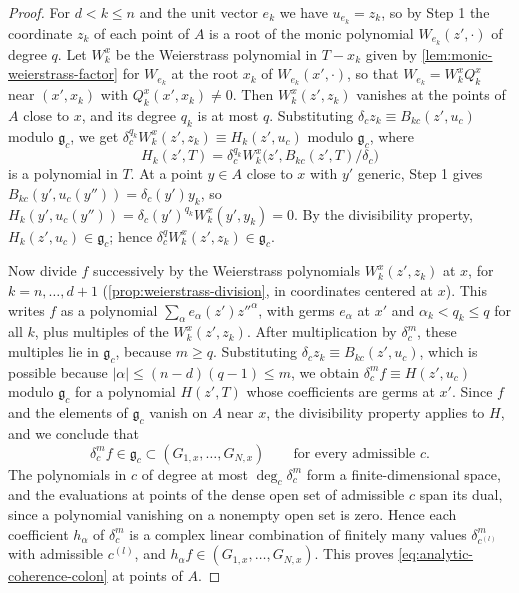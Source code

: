 \begin{proof}
For $d<k\leq n$ and the unit vector $e_k$ we have $u_{e_k}=z_k$, so by Step 1 the coordinate $z_k$ of each point of $A$ is a root of the monic polynomial $W_{e_k}(z',\cdot)$ of degree $q$. Let $W^x_k$ be the Weierstrass polynomial in $T-x_k$ given by \cref{lem:monic-weierstrass-factor} for $W_{e_k}$ at the root $x_k$ of $W_{e_k}(x',\cdot)$, so that $W_{e_k}=W^x_kQ^x_k$ near $(x',x_k)$ with $Q^x_k(x',x_k)\neq0$. Then $W^x_k(z',z_k)$ vanishes at the points of $A$ close to $x$, and its degree $q_k$ is at most $q$. Substituting $\delta_cz_k\equiv B_{kc}(z',u_c)$ modulo $\mathfrak g_c$, we get $\delta_c^{q_k}W^x_k(z',z_k)\equiv H_k(z',u_c)$ modulo $\mathfrak g_c$, where
\[
 H_k(z',T)=\delta_c^{q_k}W^x_k\bigl(z',B_{kc}(z',T)/\delta_c\bigr)
\]
is a polynomial in $T$. At a point $y\in A$ close to $x$ with $y'$ generic, Step 1 gives $B_{kc}(y',u_c(y''))=\delta_c(y')y_k$, so $H_k(y',u_c(y''))=\delta_c(y')^{q_k}W^x_k(y',y_k)=0$. By the divisibility property, $H_k(z',u_c)\in\mathfrak g_c$; hence $\delta_c^qW^x_k(z',z_k)\in\mathfrak g_c$.

Now divide $f$ successively by the Weierstrass polynomials $W^x_k(z',z_k)$ at $x$, for $k=n,\ldots,d+1$ (\cref{prop:weierstrass-division}, in coordinates centered at $x$). This writes $f$ as a polynomial $\sum_\alpha e_\alpha(z')z''^\alpha$, with germs $e_\alpha$ at $x'$ and $\alpha_k<q_k\leq q$ for all $k$, plus multiples of the $W^x_k(z',z_k)$. After multiplication by $\delta_c^m$, these multiples lie in $\mathfrak g_c$, because $m\geq q$. Substituting $\delta_cz_k\equiv B_{kc}(z',u_c)$, which is possible because $|\alpha|\leq(n-d)(q-1)\leq m$, we obtain $\delta_c^mf\equiv H(z',u_c)$ modulo $\mathfrak g_c$ for a polynomial $H(z',T)$ whose coefficients are germs at $x'$. Since $f$ and the elements of $\mathfrak g_c$ vanish on $A$ near $x$, the divisibility property applies to $H$, and we conclude that
\[
 \delta_c^m f\in\mathfrak g_c\subset(G_{1,x},\ldots,G_{N,x})\qquad\text{for every admissible }c.
\]
The polynomials in $c$ of degree at most $\deg_c\delta_c^m$ form a finite-dimensional space, and the evaluations at points of the dense open set of admissible $c$ span its dual, since a polynomial vanishing on a nonempty open set is zero. Hence each coefficient $h_\alpha$ of $\delta_c^m$ is a complex linear combination of finitely many values $\delta_{c^{(l)}}^m$ with admissible $c^{(l)}$, and $h_\alpha f\in(G_{1,x},\ldots,G_{N,x})$. This proves \eqref{eq:analytic-coherence-colon} at points of $A$.


\end{proof}
